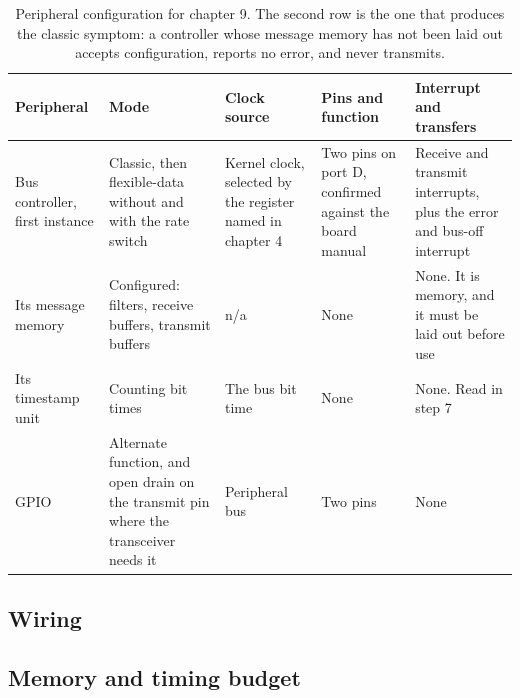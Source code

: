 \begin{table}[H]\centering\small
\begin{tabular}{p{22mm}p{26mm}p{24mm}p{30mm}p{30mm}}
\toprule
Peripheral & Mode & Clock source & Pins and function & Interrupt and transfers \\
\midrule
Bus controller, first instance & Classic, then flexible-data without and with the rate switch & Kernel clock, selected by the register named in chapter 4 & Two pins on port D, confirmed against the board manual & Receive and transmit interrupts, plus the error and bus-off interrupt \\
Its message memory & Configured: filters, receive buffers, transmit buffers & n/a & None & None. It is memory, and it must be laid out before use \\
Its timestamp unit & Counting bit times & The bus bit time & None & None. Read in step 7 \\
GPIO & Alternate function, and open drain on the transmit pin where the transceiver needs it & Peripheral bus & Two pins & None \\
\bottomrule
\end{tabular}
\caption{Peripheral configuration for chapter 9. The second row is the one that produces the classic symptom: a controller whose message memory has not been laid out accepts configuration, reports no error, and never transmits.}
\end{table}

\subsection*{Wiring}


\subsection*{Memory and timing budget}

